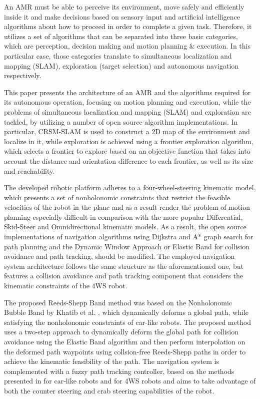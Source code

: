\documentclass[conference]{IEEEtran}
\begin{document}
An AMR must be able to perceive its environment, move safely and efficiently inside it and make decisions based on sensory input and artificial intelligence algorithms about how to proceed in order to complete a given task. Therefore, it utilizes a set of algorithms that can be separated into three basic categories, which are perception, decision making and motion planning \& execution. In this particular case, those categories translate to simultaneous localization and mapping (SLAM), exploration (target selection) and autonomous navigation respectively.

This paper presents the architecture of an AMR and the algorithms required for its autonomous operation, focusing on motion planning and execution, while the problems of simultaneous localization and mapping (SLAM) and exploration are tackled, by utilizing a number of open source algorithm implementations. In particular, CRSM-SLAM \cite{crsm} is used to construct a 2D map of the environment and localize in it, while exploration is achieved using a frontier exploration algorithm, which selects a frontier to explore based on an objective function that  takes into account the distance and orientation difference to each frontier, as well as its size and reachability.

The developed robotic platform adheres to a four-wheel-steering kinematic model, which presents a set of nonholonomic constraints that restrict the feasible velocities of the robot in the plane and as a result render the problem of motion planning especially difficult in comparison with the more popular Differential, Skid-Steer and Omnidirectional kinematic models. As a result, the open source implementations of navigation algorithms using Dijkstra and A* graph search for path planning and the Dynamic Window Approach \cite{dwa} or Elastic Band \cite{eband} for collision avoidance and path tracking, should be modified. The employed navigation system architecture follows the same structure as the aforementioned one, but features a collision avoidance and path tracking component that considers the kinematic constraints of the 4WS robot.

The proposed Reeds-Shepp Band method was based on the Nonholonomic Bubble Band by Khatib et al. \cite{dpm}, which dynamically deforms a global path, while satisfying the nonholonomic constraints of car-like robots. The proposed method uses a two-step approach to dynamically deform the global path for collision avoidance using the Elastic Band algorithm and then perform interpolation on the deformed path waypoints using collsion-free Reeds-Shepp paths \cite{reeds_shepp} in order to achieve the kinematic feasibility of the path. The navigation system is complemented with a fuzzy path tracking controller, based on the methods presented in \cite{flc_thesis} for car-like robots and \cite{reactive_fuzzy_ptc} for 4WS robots and aims to take advantage of both the counter steering and crab steering capabilities of the robot.
\end{document}
